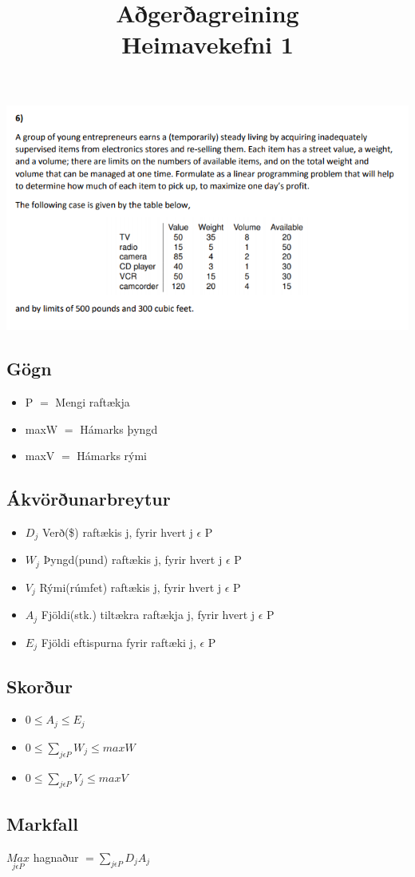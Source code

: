 \documentclass[]{article}
\begin{document}
\title{Aðgerðagreining \\ Heimavekefni 1}
\maketitle

\includegraphics*[scale=0.7]{mynd1}
\\

\subsection*{Gögn}
\begin{itemize}
	\item P $=$ Mengi raftækja
	\item maxW $=$ Hámarks þyngd
	\item maxV $=$ Hámarks rými
\end{itemize}

\subsection*{Ákvörðunarbreytur}
\begin{itemize}
	\item $D_{j}$ Verð(\$) raftækis j, fyrir hvert j $\epsilon$ P 
	\item $W_{j}$ Þyngd(pund) raftækis j, fyrir hvert j $\epsilon$ P
	\item $V_{j}$ Rými(rúmfet) raftækis j, fyrir hvert j $\epsilon$ P
	\item $A_{j}$ Fjöldi(stk.) tiltækra raftækja j, fyrir hvert j $\epsilon$ P
	\item $E_{j}$ Fjöldi eftispurna fyrir raftæki j, $\epsilon$ P
\end{itemize}

\subsection*{Skorður}
\begin{itemize}
	\item $0 \leq A_{j} \leq E_{j}$
	\item $0 \leq \sum\limits_{j \epsilon P}^{}  W_{j} \leq maxW$
	\item $0 \leq \sum\limits_{j \epsilon P}^{}  V_{j} \leq maxV$
\end{itemize}

\subsection*{Markfall}
 $\underset{j \epsilon P}{Max}$ hagnaður $= \sum\limits_{j \epsilon P}^{} D_{j}A_{j} $
 
\end{document}
